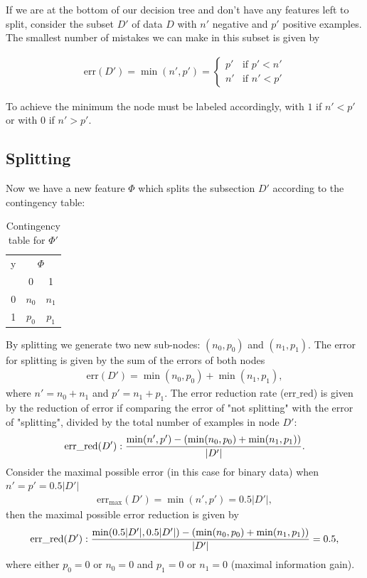 \documentclass[12pt]{article}
\begin{document}
If we are at the bottom of our decision tree and don't have any features left to split, consider the subset $D'$ of data $D$ with $n'$ negative and $p'$ positive examples. The smallest number of mistakes we can make in this subset is given by

\begin{align}
	\text{err}(D') = \min(n',p') = 
	\begin{cases}
		p' & \text{if } p'< n' \\
		n' & \text{if } n'< p'
	\end{cases}
\end{align}

To achieve the minimum the node must be labeled accordingly, with $1$ if $n'< p'$ or with $0$ if $n'> p'$. 

\subsection{Splitting}

Now we have a new feature $\Phi$ which splits the subsection $D'$ according to the contingency table:
\begin{table}[htbp]
	\centering
	\begin{tabular}{|c|c|c|}
		\toprule
		y     & \multicolumn{2}{c|}{$\Phi$} \\
		& \multicolumn{1}{c}{0} & 1 \\
		\cmidrule{2-3}    0     & $n_0$    & $n_1$ \\
		\cmidrule{2-3}    1     & $p_0$    & $p_1$ \\
		\bottomrule
	\end{tabular}%
	\caption{Contingency table for $\Phi'$}
	\label{tab:tabel1}%
\end{table}%
By splitting we generate two new sub-nodes: $(n_0,p_0)$ and $(n_1,p_1)$. The error for splitting is given by the sum of the errors of both nodes
\begin{align}
\text{err}(D') = \min(n_0,p_0) + \min(n_1,p_1),
\end{align}
where $n'=n_0 + n_1$ and $p'=n_1+p_1$. The error reduction rate ($\text{err}\_\text{red}$) is given by the reduction of error if comparing the error of "not splitting" with the error of "splitting", divided by the total number of examples in node $D'$:
\begin{align}
\text{\text{err}\_\text{red}}(D'): \frac{\min(n',p')-\left(\min(n_0,p_0) + \min(n_1,p_1)\right)}{\lvert D' \rvert}.
\end{align} 
Consider the maximal possible error (in this case for binary data) when $n'=p'=0.5 \lvert D' \rvert$
\begin{align}
\text{err}_\text{max}(D')=\min(n',p')=0.5\lvert D' \rvert,
\end{align}
then the maximal possible error reduction is given by 
\begin{align}
\text{\text{err}\_\text{red}}(D'): \frac{\min(0.5 \lvert D'\rvert,0.5 \lvert D' \rvert)-\left(\min(n_0,p_0) + \min(n_1,p_1)\right)}{\lvert D' \rvert} = 0.5,
\end{align}
where either $p_0=0$ or $n_0=0$ and $p_1=0$ or $n_1=0$ (maximal information gain).
\end{document}
